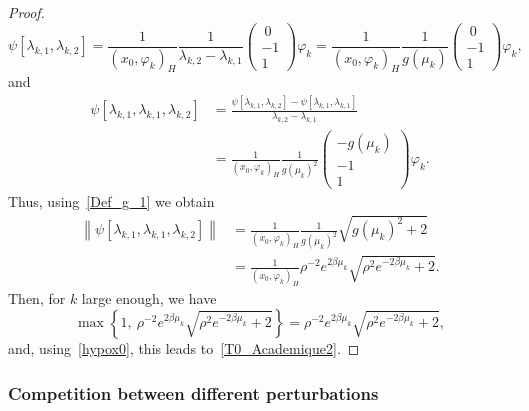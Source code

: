 \documentclass[11pt]{article}
\theoremstyle{definition}
\numberwithin{equation}{section}
\numberwithin{figure}{section}
\numberwithin{table}{section}
\newcommand{\normeX}[1]{\left\| #1 \right\|}
\newcommand{\psH}[2]{\left(#1, #2 \right)_H}
\begin{document}
\begin{proof}
\begin{equation*}
\psi[\lambda_{k,1}, \lambda_{k,2}] = \frac{1}{\psH{x_0}{\varphi_k}} \frac{1}{\lambda_{k,2}-\lambda_{k,1}}
\begin{pmatrix} \ 0\\-1\\1
\end{pmatrix} \varphi_k
= \frac{1}{\psH{x_0}{\varphi_k}} \frac{1}{g(\mu_k)}
\begin{pmatrix} \ 0\\-1\\1
\end{pmatrix} \varphi_k,
\end{equation*}
and
\begin{align*}
\psi[\lambda_{k,1},\lambda_{k,1},\lambda_{k,2}] &= \frac{\psi[\lambda_{k,1},\lambda_{k,2}]-\psi[\lambda_{k,1},\lambda_{k,1}]}{\lambda_{k,2}-\lambda_{k,1}}
\\
&= \frac{1}{\psH{x_0}{\varphi_k}} \frac{1}{g(\mu_k)^2 }
\begin{pmatrix} -g(\mu_k) \\ -1 \\ 1
\end{pmatrix} \varphi_k.
\end{align*}
Thus, using~\eqref{Def_g_1} we obtain
\begin{align*}
\normeX{ \psi[\lambda_{k,1}, \lambda_{k,1}, \lambda_{k,2}] } &= \frac{1}{\psH{x_0}{\varphi_k}} \frac{1}{g(\mu_k)^2 } \sqrt{g(\mu_k)^2+2}
\\
&= \frac{1}{\psH{x_0}{\varphi_k}} \rho^{-2} e^{2\beta \mu_k} \sqrt{\rho^2 e^{-2\beta \mu_k}+2}.
\end{align*}
Then, for $k$ large enough, we have
\[
\max \left\{ 1, \: \rho^{-2}e^{2\beta \mu_k} \sqrt{\rho^2 e^{-2\beta \mu_k}+2} \right\} = \rho^{-2} e^{2\beta \mu_k} \sqrt{\rho^2 e^{-2\beta \mu_k}+2},
\]
and, using~\eqref{hypox0}, this leads to~\eqref{T0_Academique2}.
\end{proof}



\subsubsection{Competition between different perturbations}\label{secexample3x3}
\end{document}
